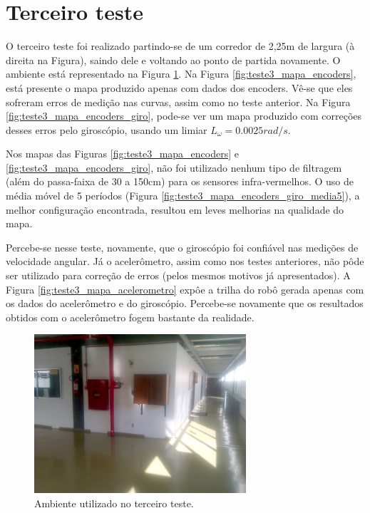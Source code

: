 \section{Terceiro teste}

O terceiro teste foi realizado partindo-se de um corredor de 2,25m de largura (à direita na Figura), saindo dele e voltando ao ponto de partida novamente. O ambiente está representado na Figura \ref{fig:teste3_foto}. Na Figura \ref{fig:teste3_mapa_encoders}, está presente o mapa produzido apenas com dados dos encoders. Vê-se que eles sofreram erros de medição nas curvas, assim como no teste anterior. Na Figura \ref{fig:teste3_mapa_encoders_giro}, pode-se ver um mapa produzido com correções desses erros pelo giroscópio, usando um limiar $L_\omega = 0.0025 \unit{rad/s}$.

Nos mapas das Figuras \ref{fig:teste3_mapa_encoders} e \ref{fig:teste3_mapa_encoders_giro}, não foi utilizado nenhum tipo de filtragem (além do passa-faixa de 30 a 150cm) para os sensores infra-vermelhos. O uso de média móvel de 5 períodos (Figura \ref{fig:teste3_mapa_encoders_giro_media5}), a melhor configuração encontrada, resultou em leves melhorias na qualidade do mapa.

Percebe-se nesse teste, novamente, que o giroscópio foi confiável nas medições de velocidade angular. Já o acelerômetro, assim como nos testes anteriores, não pôde ser utilizado para correção de erros (pelos mesmos motivos já apresentados). A Figura \ref{fig:teste3_mapa_acelerometro} expôe a trilha do robô gerada apenas com os dados do acelerômetro e do giroscópio. Percebe-se novamente que os resultados obtidos com o acelerômetro fogem bastante da realidade.

\begin{figure}[H]
	\centering
	\includegraphics[width=0.7\textwidth]{./figuras/testes/teste3/foto_ambiente.jpg}
	\caption{Ambiente utilizado no terceiro teste.}
	\label{fig:teste3_foto}
\end{figure}

